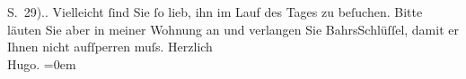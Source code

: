\begin{ledgroupsized}[t]{13cm}
{{{                            S. 29).}}}\label{K_L00286_1h}. Vielleicht ſind Sie ſo lieb, ihn im Lauf des
                    Tages zu beſuchen. Bitte läuten Sie aber in meiner Wohnung an und verlangen Sie
                        BahrsSchlüſſel, damit er Ihnen nicht
                    aufſperren muſs.\pend
           \pstart
           Herzlich{\\[\baselineskip]}\spacefill\mbox{Hugo.}\pend
           \leftskip=0em{}\endnumbering{}\end{ledgroupsized}  \newcommand{\dateiname}{L00286}\newcommand{\titel}{Hugo von Hofmannsthal an Arthur Schnitzler, 15. 12. 1893}\newcommand{\editorInnen}{ Martin Anton Müller und Gerd-Hermann Susen}
      